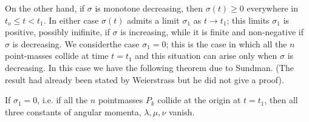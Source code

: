 On the other hand, if $\sigma$ is monotone decreasing, then $\sigma (t) \geq 0$ everywhere in $t_o \leq t < t_1$. In either case $\sigma (t)$ admits a limit $\sigma_1$ as $t \to t_1$; this limits $\sigma_1$ is positive, possibly inifinite, if $\sigma$ is increasing, while it is finite and non-negative if $\sigma$ is decreasing. We consider\pageoriginale the case $\sigma_1 = 0$; this is the case in which all the $n$ point-masses collide at time $t =t_1$ and this situation can arise only when $\sigma$ is decreasing. In this case we have the following theorem due to Sundman. (The result had already been stated by Weierstrass but he did not give a proof).

\begin{subtheorem}[Sundman]\label{chap2:thm2.2.2}
If $\sigma_1 = 0$, i.e. if all the $n$ pointmasses $P_k$ collide at the origin at $t = t_1$, then all three constants of angular momenta, $\lambda, \mu, \nu$ vanish.
\end{subtheorem}

